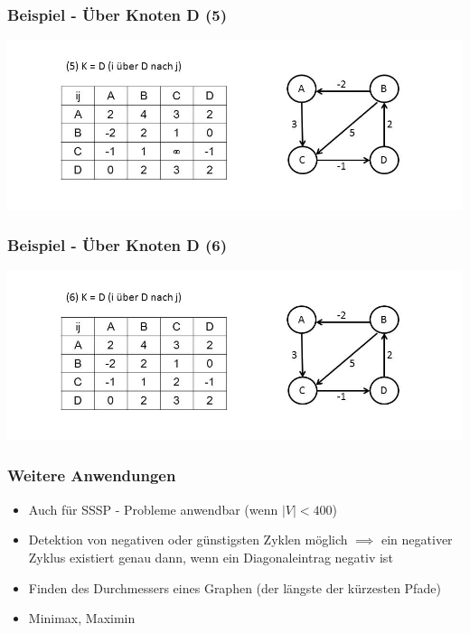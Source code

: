 
\begin{frame}
\frametitle{Beispiel - Über Knoten D (5)}

\includegraphics[width=\linewidth]{floyd_warshall_graphs/graph9.JPG}

\end{frame}


\begin{frame}
\frametitle{Beispiel - Über Knoten D (6)}

\includegraphics[width=\linewidth]{floyd_warshall_graphs/graph10.JPG}

\end{frame}


\begin{frame}
\frametitle{Weitere Anwendungen}
\begin{itemize}

\item Auch für SSSP - Probleme anwendbar (wenn $\vert V \vert < 400$)
\item Detektion von negativen oder günstigsten Zyklen möglich $\implies$ ein negativer Zyklus existiert genau dann, wenn ein Diagonaleintrag negativ ist
\item Finden des Durchmessers eines Graphen (der längste der kürzesten Pfade)
\item Minimax, Maximin
\end{itemize}
\end{frame}

